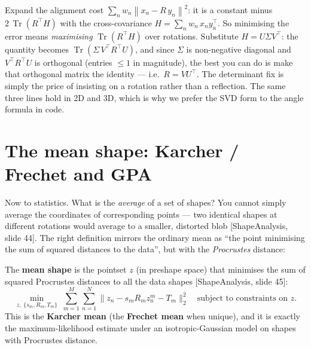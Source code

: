 \documentclass[11pt]{article}
\newcommand{\norm}[1]{\left\lVert #1 \right\rVert}
\newcommand{\deck}[1]{\textsf{\small[#1]}}
\DeclareMathOperator{\Tr}{Tr}
\begin{document}
\begin{notebox}
Expand the alignment cost $\sum_n w_n\norm{x_n - R\,y_n}^2$: it is a constant
minus $2\,\Tr(R^{\!\top}H)$ with the cross-covariance
$H=\sum_n w_n\,x_n y_n^{\!\top}$. So minimising the error means
\emph{maximising} $\Tr(R^{\!\top}H)$ over rotations. Substitute
$H=U\Sigma V^{\!\top}$: the quantity becomes $\Tr(\Sigma\,V^{\!\top}R^{\!\top}U)$,
and since $\Sigma$ is non-negative diagonal and $V^{\!\top}R^{\!\top}U$ is
orthogonal (entries $\le 1$ in magnitude), the best you can do is make that
orthogonal matrix the identity --- i.e.\ $R=VU^{\!\top}$. The determinant fix is
simply the price of insisting on a rotation rather than a reflection. The same
three lines hold in 2D and 3D, which is why we prefer the SVD form to the angle
formula in code.
\end{notebox}

\section{The mean shape: Karcher / Frechet and GPA}

Now to statistics. What is the \emph{average} of a set of shapes? You cannot
simply average the coordinates of corresponding points --- two identical shapes at
different rotations would average to a smaller, distorted blob
\deck{ShapeAnalysis, slide 44}. The right definition mirrors the ordinary mean
as ``the point minimising the sum of squared distances to the data'', but with
the \emph{Procrustes} distance:

\begin{keybox}
The \textbf{mean shape} is the pointset $z$ (in preshape space) that minimises
the sum of squared Procrustes distances to all the data shapes
\deck{ShapeAnalysis, slide 45}:
\[
\min_{z,\;\{s_m,R_m,T_m\}}\;\sum_{m=1}^{M}\sum_{n=1}^{N}
   \big\| z_n - s_m R_m z^{m}_{n} - T_m\big\|_2^2
\quad\text{subject to constraints on } z.
\]
This is the \textbf{Karcher mean} (the \textbf{Frechet mean} when unique), and it
is exactly the maximum-likelihood estimate under an isotropic-Gaussian model on
shapes with Procrustes distance.
\end{keybox}
\end{document}
